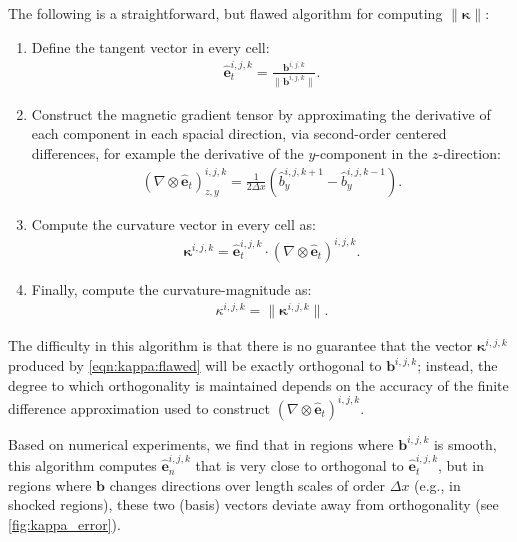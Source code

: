\documentclass[12pt,twoside]{extreport}
\newcommand{\rbrac}[1]{\left( #1 \right)} %
\newcommand{\mVector}[1]{\bm{#1}} %
\newcommand{\mVectorBase}[1]{\hat{\mVector{e}}_{#1}} %
\newcommand{\eg}{e.g.,\xspace} %
\begin{document}
The following is a straightforward, but flawed algorithm for computing $\|\mVector{\kappa}\|$:
\begin{enumerate}
    \item Define the tangent vector in every cell:
        \begin{align}
            \mVectorBase{t}^{i,j,k}
                = \frac{\mVector{b}^{i,j,k}}{\|\mVector{b}^{i,j,k}\|} .
        \end{align}
    \item Construct the magnetic gradient tensor by approximating the derivative of each component in each spacial direction, via second-order centered differences, for example the derivative of the $y$-component in the $z$-direction:
        \begin{align}
            (\nabla\otimes\mVectorBase{t})^{i,j,k}_{z,y}
                = \frac{1}{2\Delta x} \rbrac{\widehat{b}^{i,j,k+1}_y - \widehat{b}^{i,j,k-1}_y} .
        \end{align}
    \item Compute the curvature vector in every cell as:
        \begin{align}
            \mVector{\kappa}^{i,j,k}
                = \mVectorBase{t}^{i,j,k} \cdot (\nabla\otimes\mVectorBase{t})^{i,j,k}
                . \label{eqn:kappa:flawed}
        \end{align}
    \item Finally, compute the curvature-magnitude as:
        \begin{align}
            \kappa^{i,j,k}
                = \|\mVector{\kappa}^{i,j,k}\| .
        \end{align}
\end{enumerate}
The difficulty in this algorithm is that there is no guarantee that the vector $\mVector{\kappa}^{i,j,k}$ produced by \autoref{eqn:kappa:flawed} will be exactly orthogonal to $\mVector{b}^{i,j,k}$; instead, the degree to which orthogonality is maintained depends on the accuracy of the finite difference approximation used to construct $(\nabla\otimes\mVectorBase{t})^{i,j,k}$.

Based on numerical experiments, we find that in regions where $\mVector{b}^{i,j,k}$ is smooth, this algorithm computes $\mVectorBase{n}^{i,j,k}$ that is very close to orthogonal to $\mVectorBase{t}^{i,j,k}$, but in regions where $\mVector{b}$ changes directions over length scales of order $\Delta x$ (\eg in shocked regions), these two (basis) vectors deviate away from orthogonality (see \autoref{fig:kappa_error}).
\end{document}
